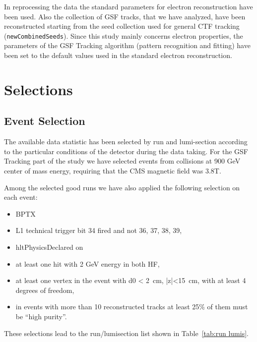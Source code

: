 In reprocessing the data the standard parameters for electron
reconstruction have been used.
Also the collection of GSF tracks, that we have analyzed, have been reconstructed starting from the 
seed collection used for general CTF tracking (\verb=newCombinedSeeds=).
Since this study mainly concerns electron properties, the parameters of the GSF Tracking 
algorithm (pattern recognition and fitting) have been set to the default values used in the 
standard electron reconstruction.

\section{Selections}\label{sec:Selections}

\subsection{Event Selection}
The available data statistic has been selected by run and lumi-section according to the
particular conditions of the detector during the data taking. 
For the GSF Tracking part of the study we have selected events from collisions at 900 GeV
center of mass energy, requiring that the CMS magnetic field was 3.8T. 

Among the selected good runs we have also applied the following selection on each event:
\begin{itemize}
\item BPTX 
\item L1 technical trigger bit 34 fired and not 36, 37, 38, 39,
\item hltPhysicsDeclared on
\item at least one hit with 2 GeV energy in both HF,
\item at least one vertex in the event with d0 < 2~cm, |z|<15~cm, with at least 4 degrees of freedom,
\item in events with more than 10 reconstructed tracks at least 25\%
  of them must be ``high purity''. 
\end{itemize}

These selections lead to the run/lumisection list shown in Table~\ref{tab:run lumis}.

